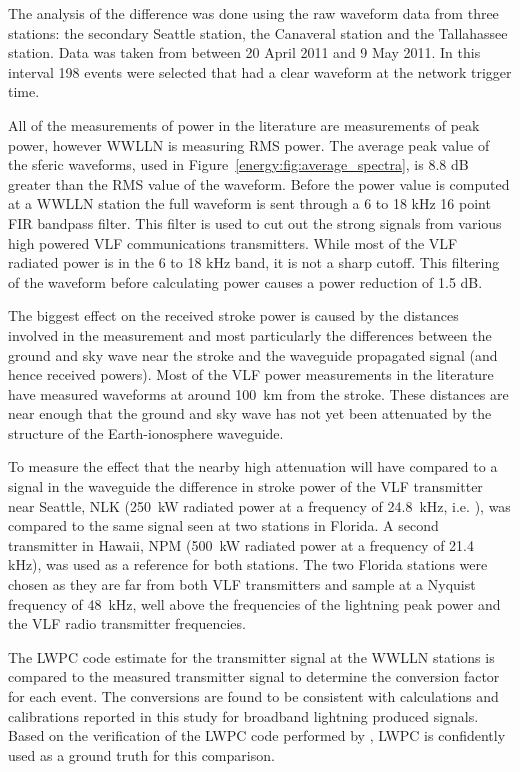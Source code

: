 The analysis of the difference was done using the raw waveform data from three stations: the secondary Seattle station, the Canaveral station and the Tallahassee station.
Data was taken from between 20 April 2011 and 9 May 2011. In this interval 198 events were selected that had a clear waveform at the network trigger time.

All of the measurements of power in the literature are measurements of peak power, however WWLLN is measuring RMS power.
The average peak value of the sferic waveforms, used in Figure~\ref{energy:fig:average_spectra}, is 8.8 dB greater than the RMS value of the waveform. 
Before the power value is computed at a WWLLN station the full waveform is sent through a 6 to 18 kHz 16 point FIR bandpass filter.
This filter is used to cut out the strong signals from various high powered VLF communications transmitters.
While most of the VLF radiated power is in the 6 to 18 kHz band, it is not a sharp cutoff.
This filtering of the waveform before calculating power causes a power reduction of 1.5 dB.

The biggest effect on the received stroke power is caused by the distances involved in the measurement and most particularly the differences between the ground and sky wave near the stroke and the waveguide propagated signal (and hence received powers).
Most of the VLF power measurements in the literature have measured waveforms at around 100~km from the stroke.
These distances are near enough that the ground and sky wave has not yet been attenuated by the structure of the Earth-ionosphere waveguide.

To measure the effect that the nearby high attenuation will have compared to a signal in the waveguide the difference in stroke power of the VLF transmitter near Seattle, NLK (250~kW radiated power at a frequency of 24.8~kHz, i.e. \citet{Clilverd2009}), was compared to the same signal seen at two stations in Florida.
A second transmitter in Hawaii, NPM (500~kW radiated power at a frequency of 21.4 kHz), was used as a reference for both stations.
The two Florida stations were chosen as they are far from both VLF transmitters and sample at a Nyquist frequency of 48~kHz, well above the frequencies of the lightning peak power and the VLF radio transmitter frequencies.

The LWPC code estimate for the transmitter signal at the WWLLN stations is compared to the measured transmitter signal to determine the conversion factor for each event.
The conversions are found to be consistent with calculations and calibrations reported in this study for broadband lightning produced signals.
Based on the verification of the LWPC code performed by \citet{Thomson2010}, LWPC is confidently used as a ground truth for this comparison.

